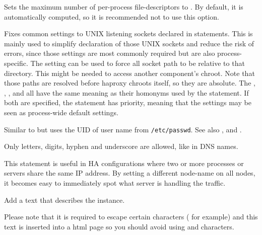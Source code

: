 \begin{keywords}
 

  Sets the maximum number of per-process file-descriptors to .
  By default, it is automatically computed, so it is recommended not to use this
  option.

 
	 
	 

  Fixes common settings to UNIX listening sockets declared in 
  statements. This is mainly used to simplify declaration of those UNIX
  sockets and reduce the risk of errors, since those settings are most commonly
  required but are also process-specific. The  setting
  can be used to force all socket path to be relative to that directory.
  This might be needed to access another component's chroot. 
  Note that those paths are resolved before haproxy chroots itself, so they
  are absolute. The , , , 
  and  all have the same meaning as their homonyms used by the
   statement. If both are specified, the  statement
  has priority, meaning that the  settings may be seen as 
  process-wide default settings.

 

  Similar to  but uses the UID of user name 
  from \verb|/etc/passwd|.
  See also ,  and .

 

  Only letters, digits, hyphen and underscore are allowed, like in DNS names.

  This statement is useful in HA configurations where two or more processes or
  servers share the same IP address. By setting a different node-name on all
  nodes, it becomes easy to immediately spot what server is handling the
  traffic.

 

  Add a text that describes the instance.

  Please note that it is required to escape certain characters
  (\CHAR{\#} for example) and this text is inserted into a html page so
  you should avoid using \CHAR{<} and \CHAR{>} characters.

\end{keywords}

